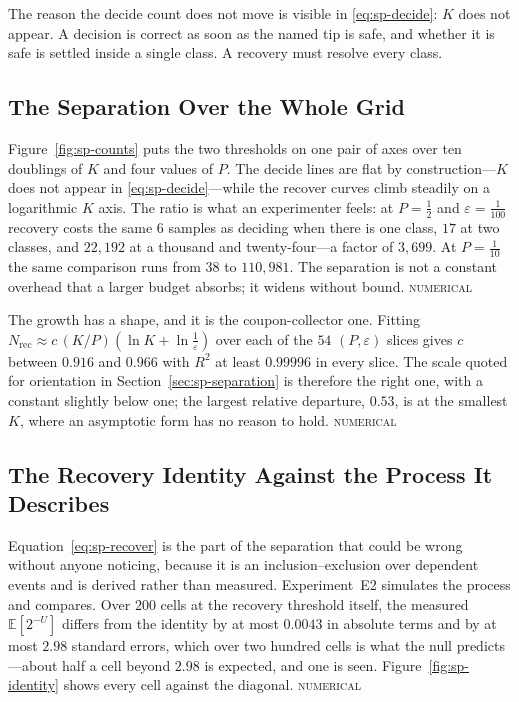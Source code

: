 \documentclass[conference]{IEEEtran}
\theoremstyle{definition}
\newcommand{\NUM}{\textsc{numerical}}
\begin{document}
The reason the decide count does not move is visible in \eqref{eq:sp-decide}: $K$ does not appear.
A decision is correct as soon as the named tip is safe, and whether it is safe is settled
inside a single class. A recovery must resolve every class.

\subsection{The Separation Over the Whole Grid}

Figure~\ref{fig:sp-counts} puts the two thresholds on one pair of axes over ten doublings of
$K$ and four values of $P$. The decide lines are flat by construction---$K$ does not appear in
\eqref{eq:sp-decide}---while the recover curves climb steadily on a logarithmic $K$ axis. The
ratio is what an experimenter feels: at $P=\tfrac12$ and $\varepsilon=\tfrac1{100}$ recovery
costs the same $6$ samples as deciding when there is one class, $17$ at two classes, and
$22{,}192$ at a thousand and twenty-four---a factor of $3{,}699$. At $P=\tfrac1{10}$ the same
comparison runs from $38$ to $110{,}981$. The separation is not a constant overhead that a
larger budget absorbs; it widens without bound. \NUM{}

The growth has a shape, and it is the coupon-collector one. Fitting
$N_{\mathrm{rec}}\approx c\,(K/P)(\ln K+\ln\tfrac1\varepsilon)$ over each of the $54$
$(P,\varepsilon)$ slices gives $c$ between $0.916$ and $0.966$ with $R^{2}$ at least
$0.99996$ in every slice. The scale quoted for orientation in Section~\ref{sec:sp-separation} is
therefore the right one, with a constant slightly below one; the largest relative departure,
$0.53$, is at the smallest $K$, where an asymptotic form has no reason to hold. \NUM{}

\subsection{The Recovery Identity Against the Process It Describes}

Equation~\eqref{eq:sp-recover} is the part of the separation that could be wrong without anyone
noticing, because it is an inclusion--exclusion over dependent events and is derived rather
than measured. Experiment~E2 simulates the process and compares. Over $200$ cells at the
recovery threshold itself, the measured $\mathbb{E}[2^{-U}]$ differs from the identity by at
most $0.0043$ in absolute terms and by at most $2.98$ standard errors, which over two hundred
cells is what the null predicts---about half a cell beyond $2.98$ is expected, and one is
seen.
Figure~\ref{fig:sp-identity} shows every cell against the diagonal. \NUM{}
\end{document}
